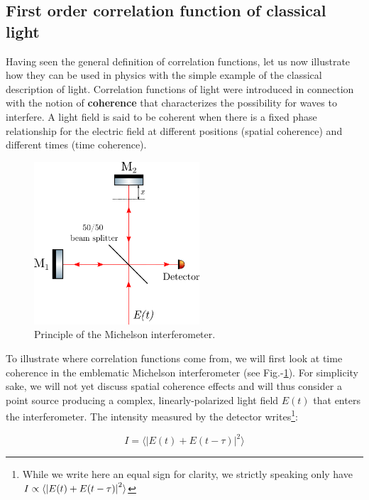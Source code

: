 \subsection{First order correlation function of classical light}

Having seen the general definition of correlation functions, let us now illustrate how they can be used in physics with the simple example of the classical description of light. Correlation functions of light were introduced in connection with the notion of \textbf{coherence} that characterizes the possibility for waves to interfere. A light field is said to be coherent when there is a fixed phase relationship for the electric field at different positions (spatial coherence) and different times (time coherence). 


\begin{figure}
    \centering
    \includegraphics[width=0.55\textwidth]{Fig/Chapter1/michelson.png}
    \caption{Principle of the Michelson interferometer.}
    \label{fig:michelson}
\end{figure}


To illustrate where correlation functions come from, we will first look at time coherence in the emblematic Michelson interferometer (see Fig.-\ref{fig:michelson}). For simplicity sake, we will not yet discuss spatial coherence effects and will thus consider a point source producing a complex, linearly-polarized light field $E(t)$ that enters the interferometer. The intensity measured by the detector writes\footnote{While we write here an equal sign for clarity, we strictly speaking only have $I \propto \langle\left\lvert E(t)+E(t-\tau)\right\rvert^2\rangle$}:

\begin{equation}
    I= \langle \lvert E(t)+E(t-\tau)\lvert^2 \rangle
    \label{eq:i_michelson}
\end{equation}


